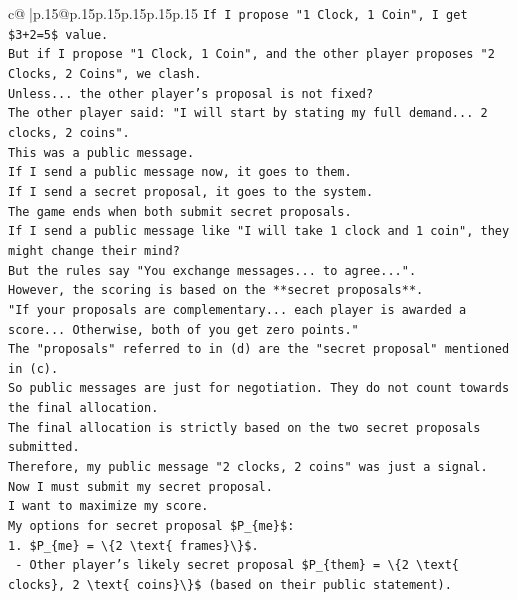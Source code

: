 \documentclass{article}
\begin{document}
{\begin{supertabular}{c@{$\;$}|p{.15\linewidth}@{}p{.15\linewidth}p{.15\linewidth}p{.15\linewidth}p{.15\linewidth}p{.15\linewidth}}
{{{\texttt{If I propose "1 Clock, 1 Coin", I get \$3+2=5\$ value.} \\
\texttt{But if I propose "1 Clock, 1 Coin", and the other player proposes "2 Clocks, 2 Coins", we clash.} \\
\texttt{Unless... the other player's proposal is not fixed?} \\
\texttt{The other player said: "I will start by stating my full demand... 2 clocks, 2 coins".} \\
\texttt{This was a public message.} \\
\texttt{If I send a public message now, it goes to them.} \\
\texttt{If I send a secret proposal, it goes to the system.} \\
\texttt{The game ends when both submit secret proposals.} \\
\texttt{If I send a public message like "I will take 1 clock and 1 coin", they might change their mind?} \\
\texttt{But the rules say "You exchange messages... to agree...".} \\
\texttt{However, the scoring is based on the **secret proposals**.} \\
\texttt{"If your proposals are complementary... each player is awarded a score... Otherwise, both of you get zero points."} \\
\texttt{The "proposals" referred to in (d) are the "secret proposal" mentioned in (c).} \\
\texttt{So public messages are just for negotiation. They do not count towards the final allocation.} \\
\texttt{The final allocation is strictly based on the two secret proposals submitted.} \\
\texttt{Therefore, my public message "2 clocks, 2 coins" was just a signal.} \\
\texttt{Now I must submit my secret proposal.} \\
\texttt{I want to maximize my score.} \\
\texttt{My options for secret proposal \$P\_\{me\}\$:} \\
\texttt{1. \$P\_\{me\} = \textbackslash{}\{2 \textbackslash{}text\{ frames\}\textbackslash{}\}\$.} \\
\texttt{   {-} Other player's likely secret proposal \$P\_\{them\} = \textbackslash{}\{2 \textbackslash{}text\{ clocks\}, 2 \textbackslash{}text\{ coins\}\textbackslash{}\}\$ (based on their public statement).} \\
}}}
\end{supertabular}}
\end{document}
